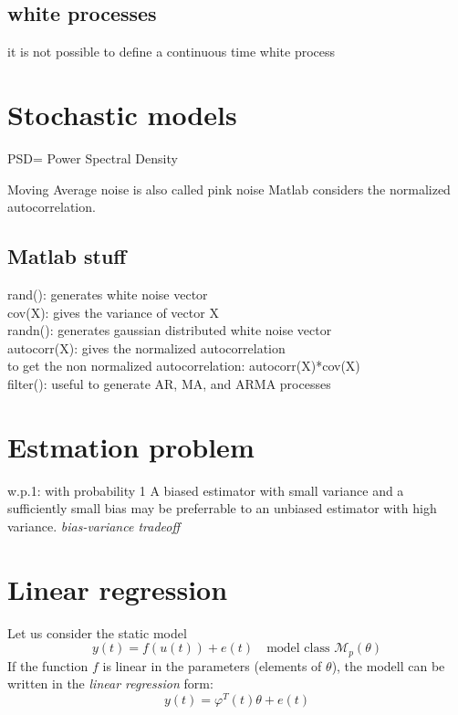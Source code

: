 \documentclass{book}
\theoremstyle{definition}
\theoremstyle{remark}
\theoremstyle{remark}
\begin{document}
\section{white processes}
it is not possible to define a continuous time white process

















\chapter{Stochastic models}


PSD= Power Spectral Density

Moving Average noise is also called pink noise
Matlab considers the normalized autocorrelation.


\section{Matlab stuff}
rand(): generates white noise vector\\
cov(X): gives the variance of vector X\\
randn(): generates gaussian distributed white noise vector\\
autocorr(X): gives the normalized autocorrelation\\
to get the non normalized autocorrelation: autocorr(X)*cov(X)\\
filter(): useful to generate AR, MA, and ARMA processes\\





\chapter{Estmation problem}
w.p.1: with probability 1
A biased estimator with small variance and a sufficiently small bias may be preferrable to an unbiased estimator with high variance. \emph{bias-variance tradeoff}

\chapter{Linear regression}
Let us consider the static model
\[
    y(t) = f(u(t))+e(t) \quad \text{model class } \mathcal{M}_p(\theta)
\]
If the function $f$ is linear in the parameters (elements of $\theta$), the modell can be written in the \emph{linear regression} form:
\[
    y(t) = \varphi^T(t)\theta+e(t)
\]
\end{document}
